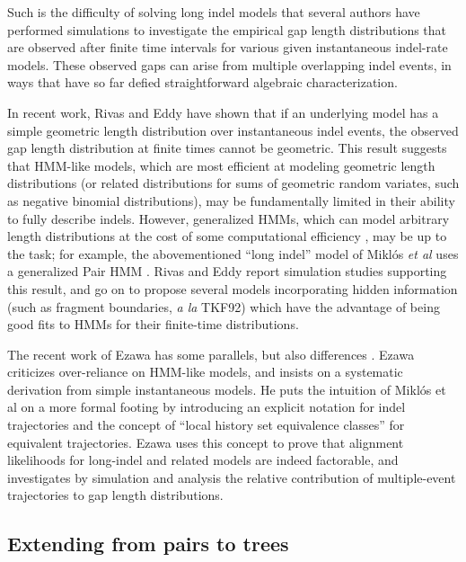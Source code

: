 \documentclass{bmcart}
\begin{document}
Such is the difficulty of solving long indel models that several authors have performed simulations
to investigate the empirical gap length distributions that are observed after finite time intervals
for various given instantaneous indel-rate models.
These observed gaps can arise from multiple overlapping indel events, in ways that have so far defied
straightforward algebraic characterization.

In recent work, Rivas and Eddy \cite{RivasEddy2015}
have shown that if an underlying model has a simple geometric length distribution over instantaneous indel events,
the observed gap length distribution at finite times cannot be geometric.
This result suggests that HMM-like models,
which are most efficient at modeling geometric length distributions
(or related distributions for sums of geometric random variates, such as negative binomial distributions),
may be fundamentally limited in their ability to fully describe indels.
However, generalized HMMs, which can model arbitrary length distributions at the cost of some
computational efficiency \cite{BurgeKarlin97}, may be up to the task;
for example, the abovementioned ``long indel'' model of Mikl\'{o}s {\em et al} uses a generalized Pair HMM \cite{MiklosLunterHolmes2004}.
Rivas and Eddy report simulation studies supporting this result,
and go on to propose several models incorporating hidden information
(such as fragment boundaries, {\em a la} TKF92)
which have the advantage of being good fits to HMMs for their finite-time distributions.

The recent work of Ezawa has some parallels, but also differences \cite{Ezawa2016a,Ezawa2016b,Ezawa2016bErratum}.
Ezawa criticizes over-reliance on HMM-like models, and insists on a systematic derivation from simple instantaneous models.
He puts the intuition of Mikl\'{o}s et al \cite{MiklosLunterHolmes2004}
on a more formal footing by introducing an explicit notation for indel trajectories
and the concept of ``local history set equivalence classes'' for equivalent trajectories.
Ezawa uses this concept to prove that alignment likelihoods for long-indel and related models are indeed factorable,
and investigates by simulation and analysis the relative contribution
of multiple-event trajectories to gap length distributions.


\subsection*{Extending from pairs to trees}
\end{document}
